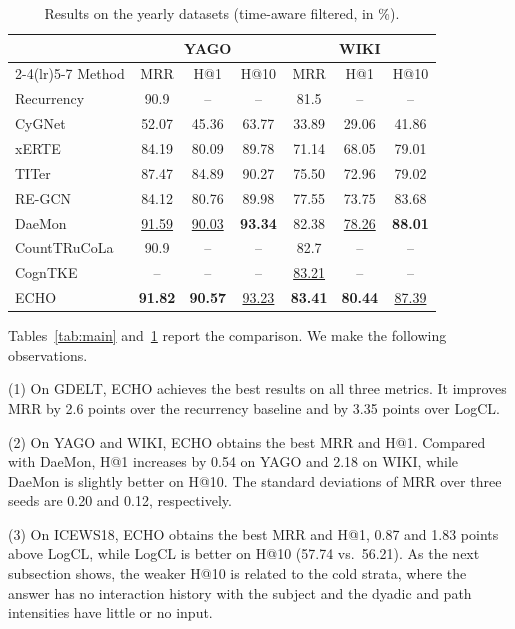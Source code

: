 \documentclass[runningheads]{llncs}
\makeatletter
\newcommand{\model}{ECHO}
\newcommand{\hone}{H@1}
\newcommand{\hten}{H@10}
\makeatother
\begin{document}
\begin{table}[t]
  \centering
  \caption{Results on the yearly datasets (time-aware filtered, in \%).}
  \label{tab:yearly}
  \setlength{\tabcolsep}{4pt}
  \small
  \begin{tabular}{l ccc ccc}
    \toprule
    & \multicolumn{3}{c}{YAGO} & \multicolumn{3}{c}{WIKI} \\
    \cmidrule(lr){2-4}\cmidrule(lr){5-7}
    Method & MRR & \hone{} & \hten{} & MRR & \hone{} & \hten{} \\
    \midrule
    Recurrency~\cite{gastinger2024history} & 90.9 & -- & -- & 81.5 & -- & -- \\
    CyGNet~\cite{zhu2021cygnet} & 52.07 & 45.36 & 63.77 & 33.89 & 29.06 & 41.86 \\
    xERTE~\cite{han2021xerte} & 84.19 & 80.09 & 89.78 & 71.14 & 68.05 & 79.01 \\
    TITer~\cite{sun2021titer} & 87.47 & 84.89 & 90.27 & 75.50 & 72.96 & 79.02 \\
    RE-GCN~\cite{li2021regcn} & 84.12 & 80.76 & 89.98 & 77.55 & 73.75 & 83.68 \\
    DaeMon~\cite{dong2023daemon} & \underline{91.59} & \underline{90.03} & \textbf{93.34} & 82.38 & \underline{78.26} & \textbf{88.01} \\
    CountTRuCoLa~\cite{gastinger2026counttrucola} & 90.9 & -- & -- & 82.7 & -- & -- \\
    CognTKE~\cite{chen2025cogntke} & -- & -- & -- & \underline{83.21} & -- & -- \\
    \midrule
    \model{} & \textbf{91.82} & \textbf{90.57} & \underline{93.23} & \textbf{83.41} & \textbf{80.44} & \underline{87.39} \\
    \bottomrule
  \end{tabular}
\end{table}

Tables~\ref{tab:main} and~\ref{tab:yearly} report the comparison. We make the following observations.

(1) On GDELT, \model{} achieves the best results on all three metrics. It improves MRR by 2.6 points over the recurrency baseline and by 3.35 points over LogCL.

(2) On YAGO and WIKI, \model{} obtains the best MRR and \hone{}. Compared with DaeMon, \hone{} increases by 0.54 on YAGO and 2.18 on WIKI, while DaeMon is slightly better on \hten{}. The standard deviations of MRR over three seeds are 0.20 and 0.12, respectively.

(3) On ICEWS18, \model{} obtains the best MRR and \hone{}, 0.87 and 1.83 points above LogCL, while LogCL is better on \hten{} (57.74 vs.\ 56.21). As the next subsection shows, the weaker \hten{} is related to the cold strata, where the answer has no interaction history with the subject and the dyadic and path intensities have little or no input.
\end{document}
